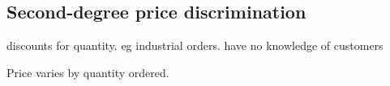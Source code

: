 
\subsection{Second-degree price discrimination}

discounts for quantity.
eg industrial orders. have no knowledge of customers

Price varies by quantity ordered.

